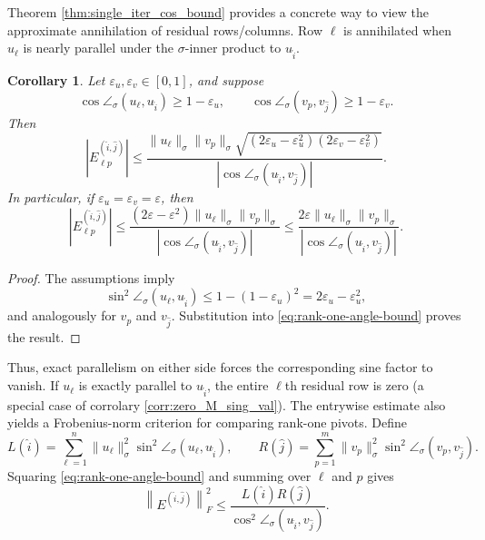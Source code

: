 \documentclass[11pt, preprint]{article}
\newtheorem{corollary}[theorem]{Corollary}
\begin{document}
Theorem \ref{thm:single_iter_cos_bound} provides a concrete way to view the approximate annihilation of residual rows/columns. Row $\ell$ is annihilated when $u_\ell$ is nearly parallel under the $\sigma$-inner product to $u_{\widehat i}$.

\begin{corollary} 
\label{corr:cur_res_from_cosines}
Let $\varepsilon_u,\varepsilon_v\in[0,1]$, and suppose
\[
\cos\angle_\sigma(u_\ell,u_{\widehat i})
\geq1-\varepsilon_u,
\qquad
\cos\angle_\sigma(v_p,v_{\widehat j})
\geq1-\varepsilon_v.
\]
Then
\begin{equation}\label{eq:nearly-parallel-rank-one-bound}
\left|E^{(\widehat i,\widehat j)}_{\ell p}\right|
\leq
\frac{
\|u_\ell\|_\sigma\|v_p\|_\sigma
\sqrt{
(2\varepsilon_u-\varepsilon_u^2)
(2\varepsilon_v-\varepsilon_v^2)
}
}{
\left|\cos\angle_\sigma(u_{\widehat i},v_{\widehat j})\right|
}.
\end{equation}
In particular, if $\varepsilon_u=\varepsilon_v=\varepsilon$, then
\[
\left|E^{(\widehat i,\widehat j)}_{\ell p}\right|
\leq
\frac{
(2\varepsilon-\varepsilon^2)
\|u_\ell\|_\sigma\|v_p\|_\sigma
}{
\left|\cos\angle_\sigma(u_{\widehat i},v_{\widehat j})\right|
}
\leq
\frac{
2\varepsilon\|u_\ell\|_\sigma\|v_p\|_\sigma
}{
\left|\cos\angle_\sigma(u_{\widehat i},v_{\widehat j})\right|
}.
\]
\end{corollary}

\begin{proof}
The assumptions imply
\[
\sin^2\angle_\sigma(u_\ell,u_{\widehat i})
\leq
1-(1-\varepsilon_u)^2
=
2\varepsilon_u-\varepsilon_u^2,
\]
and analogously for $v_p$ and $v_{\widehat j}$. Substitution into
\eqref{eq:rank-one-angle-bound} proves the result.
\end{proof}
Thus, exact parallelism on either side forces the corresponding sine factor
to vanish. If $u_\ell$ is exactly parallel to $u_{\widehat i}$, the entire $\ell$th
residual row is zero (a special case of corrolary \ref{corr:zero_M_sing_val}). The entrywise estimate also yields a Frobenius-norm criterion for comparing
rank-one pivots. Define
\[
L(\widehat i)
=
\sum_{\ell=1}^n
\|u_\ell\|_\sigma^2
\sin^2\angle_\sigma(u_\ell,u_{\widehat i}),
\qquad
R(\widehat j)
=
\sum_{p=1}^m
\|v_p\|_\sigma^2
\sin^2\angle_\sigma(v_p,v_{\widehat j}).
\]
Squaring \eqref{eq:rank-one-angle-bound} and summing over $\ell$ and $p$
gives
\begin{equation}\label{eq:rank-one-frobenius-factorization}
\left\|E^{(\widehat i,\widehat j)}\right\|_F^2
\leq
\frac{
L(\widehat i)R(\widehat j)
}{
\cos^2\angle_\sigma(u_{\widehat i},v_{\widehat j})
}.
\end{equation}
\end{document}
